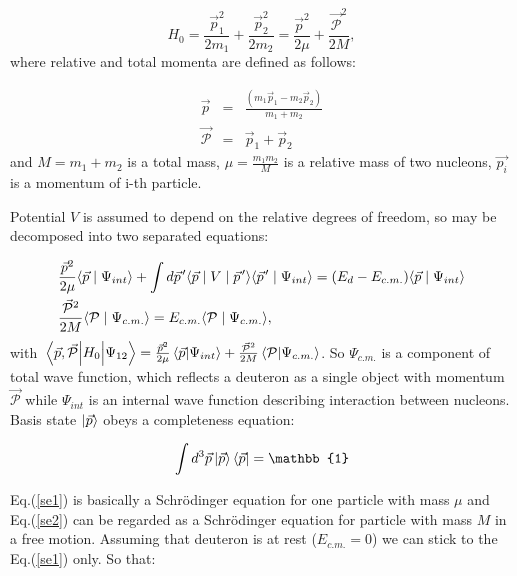     \begin{equation}
        H_0 = \frac{\vec{p}_1^2}{2m_1} + \frac{\vec{p}_2^2}{2m_2} = 
        \frac{\vec{p}^2}{2\mu} + \frac{\vec{\mathcal{P}}^2}{2M}, 
    \end{equation}
    where relative and total momenta are defined as follows:

    \begin{eqnarray}
        \vec{p} &=& \frac{(m_1\vec{p}_1 - m_2\vec{p}_2)}{m_1 + m_2}\\
        \vec{\mathcal{P}} &=& \vec{p}_1 + \vec{p}_2
    \end{eqnarray}
    and $M = m_1 + m_2$ is a total mass, $\mu = \frac{m_1m_2}{M}$ is a relative mass of two nucleons, 
    $\vec{p_i}$ is a momentum of i-th particle.

    Potential $V$ is assumed to depend on the relative degrees of freedom, so
     may be decomposed into two separated equations:

    \begin{eqnarray}
        &\frac{\vec{p}^2}{2\mu} \langle \vec{p} \mid \Psi_{int} \rangle +
        \int d \pvec{p} \langle \vec{p} \mid V \mid \pvec{p} \rangle
        \langle \pvec{p} \mid \Psi_{int} \rangle = 
        (E_d - E_{c.m.})\langle \vec{p} \mid \Psi_{int} \rangle \label{se1}\\
        &\frac{\vec{\mathcal{P}}^2}{2M} \langle \mathcal{P} \mid \Psi_{c.m.} \rangle = 
        E_{c.m.}\langle \mathcal{P} \mid \Psi_{c.m.} \rangle \label{se2},
    \end{eqnarray}
    with $\matrixel{\vec{p},\vec{\mathcal{P}}}{H_0}{\Psi_{12}} = \frac{\vec{p}^2}{2\mu} \braket{\vec{p}}{\Psi_{int}} +
    \frac{\vec{\mathcal{P}}^2}{2M} \braket {\mathcal{P}} {\Psi_{c.m.}} $. So $\Psi_{c.m.}$ is a component 
    of total wave function, which reflects a deuteron as a single object with momentum $\vec{\mathcal{P}}$
    while $\Psi_{int}$ is an internal wave function describing interaction between nucleons.
    Basis state $\ket{\vec{p}}$  obeys a completeness
    equation:

    \begin{equation}
        \int d^3\vec{p} \ket{\vec{p}} \bra{\vec{p}}   = \mathbb{1}
    \end{equation}

    Eq.(\ref{se1}) is basically a Schr\"{o}dinger equation for one particle with mass $\mu$ 
    and Eq.(\ref{se2}) can be regarded as a Schr\"{o}dinger equation for particle with mass $M$ in 
    a free motion. Assuming that deuteron is at rest ($E_{c.m.} = 0$) we can stick 
    to the Eq.(\ref{se1}) only. So that:

